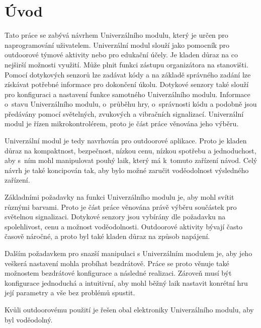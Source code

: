 \chapter*{Úvod}
{}
Tato práce se zabývá návrhem Univerzálního modulu, který je určen pro naprogramování uživatelem. Univerzální modul slouží jako pomocník pro outdoorové 
týmové aktivity nebo pro edukační účely. Je kladen důraz na co 
nejširší možnosti využití. Může plnit funkci zástupu organizátora na stanovišti. Pomocí dotykových senzorů lze zadávat kódy a na základě správného 
zadání lze získávat potřebné informace pro dokončení úkolu. Dotykové
senzory také slouží pro konfiguraci a nastavení funkce samotného Univerzálního modulu. Informace o~stavu Univerzálního modulu, o~průběhu hry, o~správnosti kódu a podobně
jsou předávány pomocí světelných, zvukových a vibračních signalizací. 
Univerzální modul je řízen mikrokontrolérem, proto je část práce věnována jeho výběru.

Univerzální modul je tedy navrhován pro outdoorové aplikace. Proto je kladen důraz na kompaktnost, bezpečnost, nízkou cenu, nízkou spotřebu a jednoduchost, 
aby s~ním mohl manipulovat pouhý laik, který má k~tomuto zařízení návod. Celý návrh je také koncipován tak, aby bylo možné zaručit voděodolnost 
výsledného zařízení. 

Základními požadavky na funkci Univerzálního modulu je, aby mohl svítit různými barvami. Proto je část práce věnována právě výběru součástek pro světelnou 
signalizaci. Dotykové senzory jsou vybírány dle požadavku na spolehlivost, cenu a možnost voděodolnosti. Outdoorové aktivity bývají často časově náročné, 
a proto byl také kladen důraz na způsob napájení. 

Dalším požadavkem pro snazší manipulaci s Univerzálním modulem je, aby jeho veškerá nastavení mohla probíhat bezdrátově. Práce se proto věnuje také možnostem 
bezdrátové konfigurace a následné realizaci. Zároveň musí být konfigurace jednoduchá a intuitivní, aby mohl běžný laik nastavit konrétní hru její parametry a 
vše bez problémů spustit.  

Kvůli outdoorovému použití je řešen obal elektroniky Univerzálního modulu, aby byl voděodolný. 





